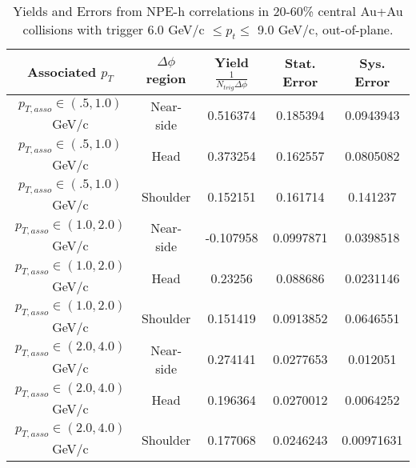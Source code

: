 \begin{table}
\centering
\begin{tabular}{|c|c|c|c|c|}
\hline
Associated $p_T$    & $\Delta\phi$ region & Yield $\frac{1}{N_{trig} \Delta\phi}$ & Stat. Error & Sys. Error\\
\hline
$p_{T,asso} \in(.5, 1.0)$ GeV/c  & Near-side & 0.516374 & 0.185394 & 0.0943943 \\
\hline
$p_{T,asso} \in(.5, 1.0)$ GeV/c  & Head & 0.373254 & 0.162557 & 0.0805082 \\
\hline
$p_{T,asso} \in(.5, 1.0)$ GeV/c  & Shoulder & 0.152151 & 0.161714 & 0.141237 \\
\hline
$p_{T,asso} \in(1.0, 2.0)$ GeV/c  & Near-side & -0.107958 & 0.0997871 & 0.0398518 \\
\hline
$p_{T,asso} \in(1.0, 2.0)$ GeV/c  & Head & 0.23256 & 0.088686 & 0.0231146 \\
\hline
$p_{T,asso} \in(1.0, 2.0)$ GeV/c  & Shoulder & 0.151419 & 0.0913852 & 0.0646551 \\
\hline
$p_{T,asso} \in(2.0, 4.0)$ GeV/c  & Near-side & 0.274141 & 0.0277653 & 0.012051 \\
\hline
$p_{T,asso} \in(2.0, 4.0)$ GeV/c  & Head & 0.196364 & 0.0270012 & 0.0064252 \\
\hline
$p_{T,asso} \in(2.0, 4.0)$ GeV/c  & Shoulder & 0.177068 & 0.0246243 & 0.00971631 \\
\hline
\end{tabular}
\caption[Yields and Errors in Au+Au Correlations, Out-of-Plane, 20-60\%, High Trigger]{Yields and Errors from NPE-h correlations in 20-60\% central Au+Au collisions with trigger 6.0 GeV/c $\leq p_t \leq $ 9.0 GeV/c, out-of-plane.}
\label{tab:OutPlaneHigh}
\end{table}


